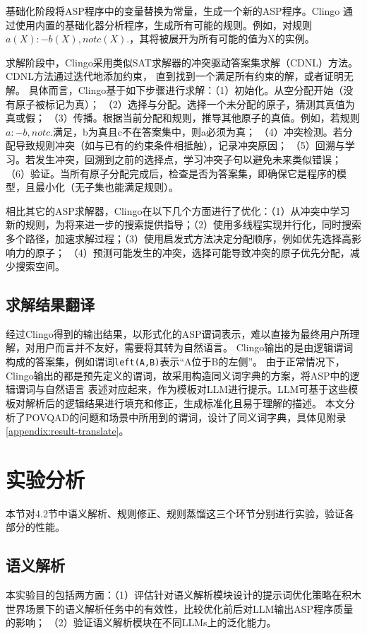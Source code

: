 基础化阶段将ASP程序中的变量替换为常量，生成一个新的ASP程序。Clingo
通过使用内置的基础化器分析程序，生成所有可能的规则。例如，对规则
$a(X) :- b(X), not c(X).$，其将被展开为所有可能的值为X的实例。

求解阶段中，Clingo采用类似SAT求解器的冲突驱动答案集求解（CDNL）方法。CDNL方法通过迭代地添加约束，
直到找到一个满足所有约束的解，或者证明无解。
具体而言，Clingo基于如下步骤进行求解：（1）初始化。从空分配开始（没有原子被标记为真）；
（2）选择与分配。选择一个未分配的原子，猜测其真值为真或假；
（3）传播。根据当前分配和规则，推导其他原子的真值。例如，若规则$a :- b, not c.$满足，b为真且c不在答案集中，则a必须为真；
（4）冲突检测。若分配导致规则冲突（如与已有的约束条件相抵触），记录冲突原因；
（5）回溯与学习。若发生冲突，回溯到之前的选择点，学习冲突子句以避免未来类似错误；
（6）验证。当所有原子分配完成后，检查是否为答案集，即确保它是程序的模型，且最小化（无子集也能满足规则）。

相比其它的ASP求解器，Clingo在以下几个方面进行了优化：（1）从冲突中学习
新的规则，为将来进一步的搜索提供指导；（2）使用多线程实现并行化，同时搜索
多个路径，加速求解过程；（3）使用启发式方法决定分配顺序，例如优先选择高影响力的原子；
（4）预测可能发生的冲突，选择可能导致冲突的原子优先分配，减少搜索空间。
\subsection{求解结果翻译}
经过Clingo得到的输出结果，以形式化的ASP谓词表示，难以直接为最终用户所理解，对用户而言并不友好，需要将其转为自然语言。
Clingo输出的是由逻辑谓词构成的答案集，例如谓词\texttt{left(A,B)}表示“A位于B的左侧”。
由于正常情况下，Clingo输出的都是预先定义的谓词，故采用构造同义词字典的方案，将ASP中的逻辑谓词与自然语言
表述对应起来，作为模板对LLM进行提示。LLM可基于这些模板对解析后的逻辑结果进行填充和修正，生成标准化且易于理解的描述。
本文分析了POVQAD的问题和场景中所用到的谓词，设计了同义词字典，具体见附录\ref{appendix:result-translate}。
\section{实验分析}
本节对4.2节中语义解析、规则修正、规则蒸馏这三个环节分别进行实验，验证各部分的性能。
\subsection{语义解析}
本实验目的包括两方面：（1）评估针对语义解析模块设计的提示词优化策略在积木世界场景下的语义解析任务中的有效性，比较优化前后对LLM输出ASP程序质量的影响；
（2）验证语义解析模块在不同LLMs上的泛化能力。

